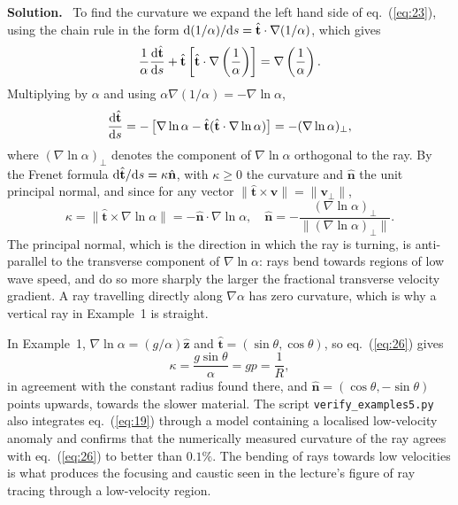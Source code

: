 \documentclass[a4paper,12pt]{paper}
\newcounter{example}
\newenvironment{solution}{\par\noindent\textbf{Solution.}\ }{\par\medskip}
\begin{document}
\begin{solution}
To find the curvature we expand the left hand side of eq.~(\ref{eq:23}), using the chain
rule in the form $\mathrm{d}(1/\alpha)/\mathrm{d} s=\hat{\mathbf{t}}\cdot\nabla(1/\alpha)$, which gives
\begin{equation}
\frac{1}{\alpha}\frac{\mathrm{d}\hat{\mathbf{t}}}{\mathrm{d} s}+\hat{\mathbf{t}}\left[\hat{\mathbf{t}}\cdot\nabla\left(\frac{1}{\alpha}\right)\right]
=\nabla\left(\frac{1}{\alpha}\right).
\label{eq:24}
\end{equation}
Multiplying by $\alpha$ and using $\alpha\nabla(1/\alpha)=-\nabla\ln\alpha$,
\begin{equation}
\frac{\mathrm{d}\hat{\mathbf{t}}}{\mathrm{d} s}=-\left[\nabla\ln\alpha-\hat{\mathbf{t}}(\hat{\mathbf{t}}\cdot\nabla\ln\alpha)\right]
=-(\nabla\ln\alpha)_{\perp},
\label{eq:25}
\end{equation}
where $(\nabla\ln\alpha)_{\perp}$ denotes the component of $\nabla\ln\alpha$ orthogonal to the ray.
By the Frenet formula $\mathrm{d}\hat{\mathbf{t}}/\mathrm{d} s=\kappa\hat{\mathbf{n}}$, with $\kappa\ge0$ the
curvature and $\hat{\mathbf{n}}$ the unit principal normal, and since for any vector
$\|\hat{\mathbf{t}}\times\mathbf{v}\|=\|\mathbf{v}_{\perp}\|$,
\begin{equation}
\kappa=\|\hat{\mathbf{t}}\times\nabla\ln\alpha\|=-\hat{\mathbf{n}}\cdot\nabla\ln\alpha,\quad
\hat{\mathbf{n}}=-\frac{(\nabla\ln\alpha)_{\perp}}{\|(\nabla\ln\alpha)_{\perp}\|}.
\label{eq:26}
\end{equation}
The principal normal, which is the direction in which the ray is turning, is anti-parallel to the
transverse component of $\nabla\ln\alpha$: rays bend towards regions of low wave speed, and do so
more sharply the larger the fractional transverse velocity gradient. A ray travelling directly
along $\nabla\alpha$ has zero curvature, which is why a vertical ray in Example~1 is straight.

In Example~1, $\nabla\ln\alpha=(g/\alpha)\hat{\mathbf{z}}$ and $\hat{\mathbf{t}}=(\sin\theta,\cos\theta)$,
so eq.~(\ref{eq:26}) gives
\begin{equation}
\kappa=\frac{g\sin\theta}{\alpha}=gp=\frac{1}{R},
\label{eq:27}
\end{equation}
in agreement with the constant radius found there, and $\hat{\mathbf{n}}=(\cos\theta,-\sin\theta)$
points upwards, towards the slower material. The script \texttt{verify\_examples5.py} also
integrates eq.~(\ref{eq:19}) through a model containing a localised low-velocity anomaly and
confirms that the numerically measured curvature of the ray agrees with eq.~(\ref{eq:26}) to better
than $0.1\%$. The bending of rays towards low velocities is what produces the focusing and caustic
seen in the lecture's figure of ray tracing through a low-velocity region.
\end{solution}
\end{document}
